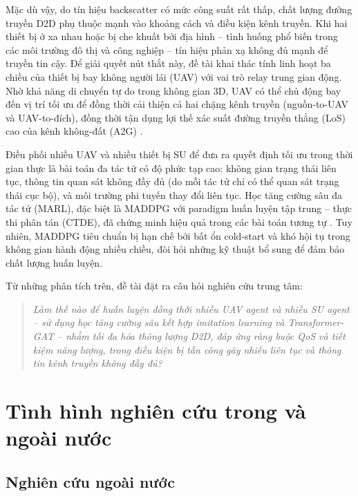 Mặc dù vậy, do tín hiệu backscatter có mức công suất rất thấp, chất lượng đường truyền D2D
phụ thuộc mạnh vào khoảng cách và điều kiện kênh truyền. Khi hai thiết bị ở xa nhau hoặc bị
che khuất bởi địa hình -- tình huống phổ biến trong các môi trường đô thị và công nghiệp --
tín hiệu phản xạ không đủ mạnh để truyền tin cậy. Để giải quyết nút thắt này, đề tài khai
thác tính linh hoạt ba chiều của thiết bị bay không người lái (UAV) với vai trò relay trung
gian động. Nhờ khả năng di chuyển tự do trong không gian 3D, UAV có thể chủ động bay đến
vị trí tối ưu để đồng thời cải thiện cả hai chặng kênh truyền (nguồn-to-UAV và UAV-to-đích),
đồng thời tận dụng lợi thế xác suất đường truyền thẳng (LoS) cao của kênh không-đất (A2G)
\cite{duo2020antijamming3d}.

Điều phối nhiều UAV và nhiều thiết bị SU để đưa ra quyết định tối ưu trong thời gian thực
là bài toán đa tác tử có độ phức tạp cao: không gian trạng thái liên tục, thông tin quan sát
không đầy đủ (do mỗi tác tử chỉ có thể quan sát trạng thái cục bộ), và môi trường phi tuyến
thay đổi liên tục. Học tăng cường sâu đa tác tử (MARL), đặc biệt là MADDPG với paradigm
huấn luyện tập trung -- thực thi phân tán (CTDE), đã chứng minh hiệu quả trong các bài toán
tương tự \cite{lowe2017maddpg}. Tuy nhiên, MADDPG tiêu chuẩn bị hạn chế bởi bất ổn
cold-start và khó hội tụ trong không gian hành động nhiều chiều, đòi hỏi những kỹ thuật
bổ sung để đảm bảo chất lượng huấn luyện.

Từ những phân tích trên, đề tài đặt ra câu hỏi nghiên cứu trung tâm:

\begin{quote}
\itshape
Làm thế nào để huấn luyện đồng thời nhiều UAV agent và nhiều SU agent -- sử dụng học tăng
cường sâu kết hợp imitation learning và Transformer-GAT -- nhằm tối đa hóa thông lượng D2D,
đáp ứng ràng buộc QoS và tiết kiệm năng lượng, trong điều kiện bị tấn công gây nhiễu liên
tục và thông tin kênh truyền không đầy đủ?
\end{quote}

\section{Tình hình nghiên cứu trong và ngoài nước}
\label{sec:intro:sota}

\subsection{Nghiên cứu ngoài nước}
\label{subsec:intro:sota:global}

